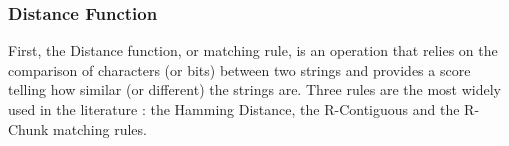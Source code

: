 \subsubsection{Distance Function} \label{sec:bgNSADistance}


First, the Distance function, or matching rule, is an operation that relies on the comparison of characters (or bits) between two strings and provides a score telling how similar (or different) the strings are. Three rules are the most widely used in the literature \cite{EffectBinaryRule2003}: the Hamming Distance, the R-Contiguous and the R-Chunk matching rules. 


